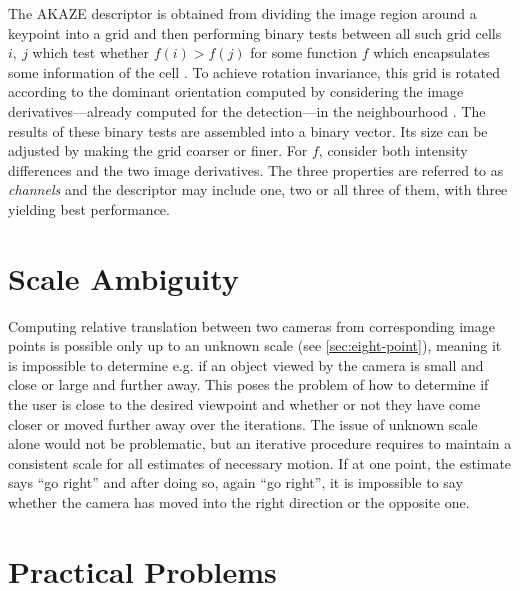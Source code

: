 The AKAZE descriptor is obtained from dividing the image region around a
keypoint into a grid and then performing binary tests between all such grid
cells $i,~j$ which test whether $f(i) > f(j)$ for some function $f$ which
encapsulates some information of the cell \citep{yang2012}. To achieve rotation
invariance, this grid is rotated according to the dominant orientation computed
by considering the image derivatives---already computed for the detection---in
the neighbourhood \citep{alcantarilla2012}. The results of these binary tests are
assembled into a binary vector. Its size can be adjusted by making the grid
coarser or finer. For $f$, \citet{alcantarilla2012} consider both intensity
differences and the two image derivatives. The three properties are referred to as
\emph{channels} and the descriptor may include one, two or all three of them,
with three yielding best performance.

\section{Scale Ambiguity}

Computing relative translation between two cameras from corresponding image
points is possible only up to an unknown scale (see \autoref{sec:eight-point}),
meaning it is impossible to determine e.g. if an object viewed by the camera is
small and close or large and further away.  This poses the problem of how to
determine if the user is close to the desired viewpoint and whether or not they
have come closer or moved further away over the iterations.  The issue of
unknown scale alone would not be problematic, but an iterative procedure
requires to maintain a consistent scale for all estimates of necessary motion.
If at one point, the estimate says ``go right'' and after doing so, again ``go
right'', it is impossible to say whether the camera has moved into the right
direction or the opposite one.

\section{Practical Problems}
\label{sec:app_challenges}

